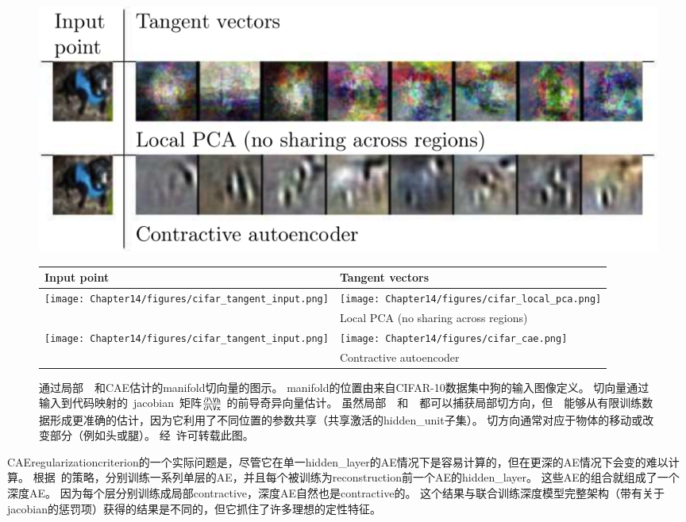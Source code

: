 \begin{figure}[ht]
\centering
\ifOpenSource
\centerline{\includegraphics[scale=0.5]{images/127.png}}
\else
\begin{tabular}{p{.1\figwidth}|p{.86\figwidth}}
Input point & Tangent vectors\\
\hline 
\texttt{[image: Chapter14/figures/cifar\_tangent\_input.png]} & 
\texttt{[image: Chapter14/figures/cifar\_local\_pca.png]}\\
 & Local PCA (no sharing across regions)\\
 \hline
\texttt{[image: Chapter14/figures/cifar\_tangent\_input.png]} & 
\texttt{[image: Chapter14/figures/cifar\_cae.png]}\\
 & Contractive autoencoder\\
\end{tabular}
\fi
\caption{通过局部~~和\gls{CAE}估计的\gls{manifold}切向量的图示。
\gls{manifold}的位置由来自CIFAR-10数据集中狗的输入图像定义。
切向量通过输入到代码映射的~\gls{jacobian}~矩阵$\frac{\partial \Vh}{\partial \Vx}$ 的前导奇异向量估计。
虽然局部~~和~~都可以捕获局部切方向，但~~能够从有限训练数据形成更准确的估计，因为它利用了不同位置的参数共享（共享激活的\gls{hidden_unit}子集）。
切方向通常对应于物体的移动或改变部分（例如头或腿）。
经~\citet{Dauphin-et-al-NIPS2011-small}许可转载此图。
}
\label{fig:chap14_cifar_cae}
\end{figure}


\gls{CAE}\gls{regularization}\gls{criterion}的一个实际问题是，尽管它在单一\gls{hidden_layer}的\gls{AE}情况下是容易计算的，但在更深的\gls{AE}情况下会变的难以计算。
根据~\citet{Rifai+al-2011-small}的策略，分别训练一系列单层的\gls{AE}，并且每个被训练为\gls{reconstruction}前一个\gls{AE}的\gls{hidden_layer}。
这些\gls{AE}的组合就组成了一个深度\gls{AE}。
因为每个层分别训练成局部\gls{contractive}，深度\gls{AE}自然也是\gls{contractive}的。
这个结果与联合训练深度模型完整架构（带有关于\gls{jacobian}的惩罚项）获得的结果是不同的，但它抓住了许多理想的定性特征。


